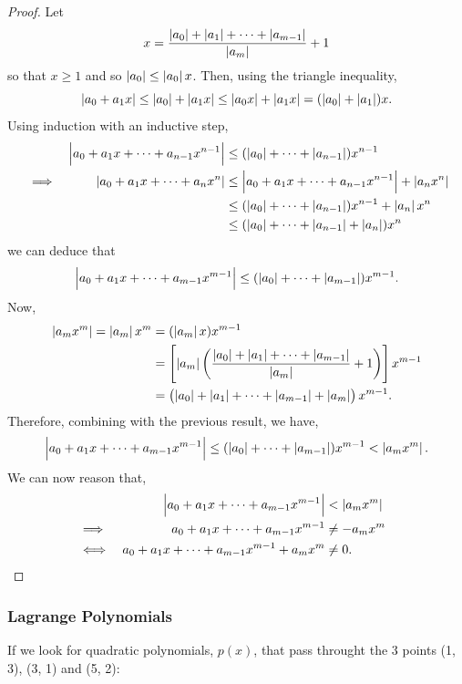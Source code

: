 \documentclass[MathsNotesBase.tex]{subfiles}
\begin{document}
{\begin{proof}
		Let
		\[ x = \frac{\left\lvert a_0\right\rvert + \left\lvert a_1\right\rvert + \cdots + \left\lvert a_{m-1}\right\rvert}{\left\lvert a_m\right\rvert} + 1 \]
		so that ${ x \geq 1 }$ and so ${ \left\lvert a_0\right\rvert \leq \left\lvert a_0\right\rvert x }$. Then, using the triangle inequality,
		\[ \left\lvert a_0 + a_1 x\right\rvert \leq \left\lvert a_0\right\rvert + \left\lvert a_1 x\right\rvert \leq \left\lvert a_0 x\right\rvert + \left\lvert a_1 x\right\rvert = (\left\lvert a_0\right\rvert + \left\lvert a_1\right\rvert) x. \]
		Using induction with an inductive step,
		\begin{align*}
		&& \left\lvert a_0 + a_1 x + \cdots + a_{n-1} x^{n-1}\right\rvert &\leq (\left\lvert a_0\right\rvert + \cdots + \left\lvert a_{n-1}\right\rvert) x^{n-1} \\
		&\implies & \left\lvert a_0 + a_1 x + \cdots + a_n x^n\right\rvert &\leq \left\lvert a_0 + a_1 x + \cdots + a_{n-1} x^{n-1}\right\rvert + \left\lvert a_n x^n\right\rvert\\
		&&&\leq (\left\lvert a_0\right\rvert + \cdots + \left\lvert a_{n-1}\right\rvert) x^{n-1} + \left\lvert a_n\right\rvert x^n \\
		&&&\leq (\left\lvert a_0\right\rvert + \cdots + \left\lvert a_{n-1}\right\rvert + \left\lvert a_n\right\rvert) x^n
		\end{align*}
		we can deduce that
		\[ \left\lvert a_0 + a_1 x + \cdots + a_{m-1} x^{m-1}\right\rvert \leq (\left\lvert a_0\right\rvert + \cdots + \left\lvert a_{m-1}\right\rvert) x^{m-1}. \]
		Now, 
		\begin{align*}
		\left\lvert a_m x^m\right\rvert = \left\lvert a_m\right\rvert x^m &= (\left\lvert a_m\right\rvert x) x^{m-1} \\
		&= \left[\left\lvert a_m\right\rvert \left(\frac{\left\lvert a_0\right\rvert + \left\lvert a_1\right\rvert + \cdots + \left\lvert a_{m-1}\right\rvert}{\left\lvert a_m\right\rvert} + 1\right)\right] x^{m-1}\\
		&= \left(\left\lvert a_0\right\rvert + \left\lvert a_1\right\rvert + \cdots + \left\lvert a_{m-1}\right\rvert + \left\lvert a_m\right\rvert\right) x^{m-1}.
		\end{align*}
		Therefore, combining with the previous result, we have,
		\[ \left\lvert a_0 + a_1 x + \cdots + a_{m-1} x^{m-1}\right\rvert \leq (\left\lvert a_0\right\rvert + \cdots + \left\lvert a_{m-1}\right\rvert) x^{m-1} < \left\lvert a_m x^m\right\rvert. \]
		We can now reason that,
		\begin{align*}
		&& \left\lvert a_0 + a_1 x + \cdots + a_{m-1} x^{m-1}\right\rvert &<  \left\lvert a_m x^m\right\rvert \\
		&\implies & a_0 + a_1 x + \cdots + a_{m-1} x^{m-1} &\neq -a_m x^m  &\text{\scriptsize{}} \\
		&\iff & a_0 + a_1 x + \cdots + a_{m-1} x^{m-1} + a_m x^m &\neq 0.
		\end{align*}
	\end{proof}

	\bigskip\bigskip
	\subsubsection{Lagrange Polynomials}
	\bigskip
	\begin{par}
	\begin{flushleft}
	If we look for quadratic polynomials, $p\left(x\right)$, that pass throught the 3 points (1, 3), (3, 1) and (5, 2):
	\end{flushleft}
	\end{par}
	
}
\end{document}
